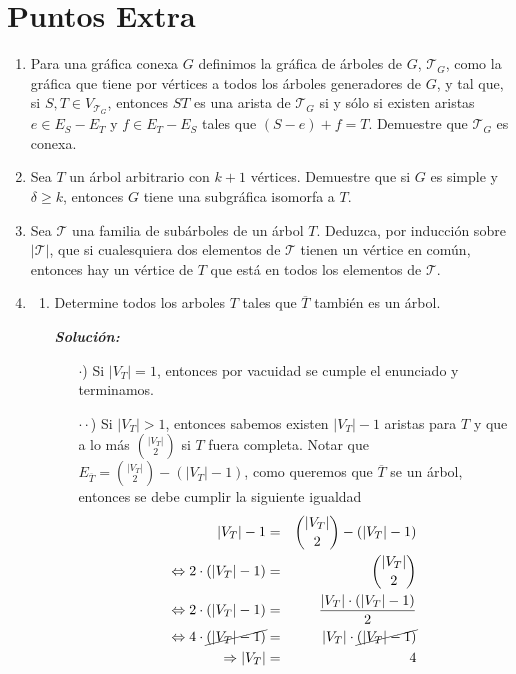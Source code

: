 \documentclass{article}
\begin{document}
\section*{Puntos Extra}
\begin{enumerate}
  \item Para una gr\'afica conexa $G$ definimos la
    gr\'afica de \'arboles de $G$, $\mathcal{T}_G$,
    como la gr\'afica que tiene por v\'ertices a
    todos los \'arboles generadores de $G$, y tal que,
    si $S, T \in V_{\mathcal{T}_G}$, entonces $ST$ es
    una arista de $\mathcal{T}_G$ si y s\'olo si
    existen aristas $e \in E_S - E_T$ y $f \in E_T -
    E_S$ tales que $(S - e) + f = T$.   Demuestre que
    $\mathcal{T}_G$ es conexa.
  \item Sea $T$ un \'arbol arbitrario con $k+1$ v\'ertices.
    Demuestre que si $G$ es simple y $\delta \ge k$,
    entonces $G$ tiene una subgr\'afica isomorfa a $T$.
  \item Sea $\mathcal{T}$ una familia de sub\'arboles
    de un \'arbol $T$.   Deduzca, por inducci\'on sobre
    $|\mathcal{T}|$, que si cualesquiera dos elementos
    de $\mathcal{T}$ tienen un v\'ertice en com\'un,
    entonces hay un v\'ertice de $T$ que est\'a en
    todos los elementos de $\mathcal{T}$.
  \item \begin{enumerate}
    \item Determine todos los arboles $T$ tales que
      $\overline T$ tambi\'en es un \'arbol.
      
      \textbf{\textit{Soluci\'on:}} 
      \begin{itemize}
      \item[$\cdot$)]  Si $|V_T| = 1$, entonces por vacuidad se cumple
        el enunciado y terminamos.
      \item[$\cdot \cdot$)] Si $|V_T| > 1$, entonces sabemos existen $|V_T| -1$
        aristas para $T$ y que a lo más ${|V_T| \choose 2}$ si $T$ fuera
        completa. Notar que $E_{\overline{T}} = {|V_T| \choose 2} - (|V_T| -1)$,
        como queremos que $\overline{T}$ se un árbol, entonces se debe cumplir
        la siguiente igualdad
        \begin{eqnarray*}
          |V_T| -1 &=& {|V_T| \choose 2} - (|V_T| -1)\\
          \Leftrightarrow 2 \cdot (|V_T| -1) &=& {|V_T| \choose 2}\\
          \Leftrightarrow 2 \cdot (|V_T| -1) &=& \frac{|V_T| \cdot (|V_T| -1)}{2}\\
          \Leftrightarrow 4 \cdot \cancel{(|V_T| -1)} &=& |V_T| \cdot \cancel{(|V_T| -1)}\\
          \Rightarrow |V_T| &=& 4
        \end{eqnarray*}
        

\end{itemize}
\end{enumerate}
\end{enumerate}
\end{document}

